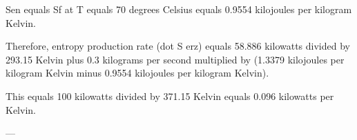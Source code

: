 Sen equals Sf at T equals 70 degrees Celsius equals 0.9554 kilojoules per kilogram Kelvin.  

Therefore, entropy production rate (dot S erz) equals 58.886 kilowatts divided by 293.15 Kelvin plus 0.3 kilograms per second multiplied by (1.3379 kilojoules per kilogram Kelvin minus 0.9554 kilojoules per kilogram Kelvin).  

This equals 100 kilowatts divided by 371.15 Kelvin equals 0.096 kilowatts per Kelvin.  

---